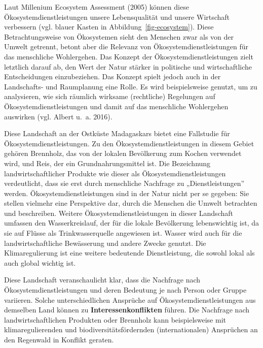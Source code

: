 \documentclass[
  nswissgerman,
  a4paper,
  openany]{book}
\begin{document}
Laut Millenium Ecosystem Assessment (2005) können diese
Ökosystemdienstleistungen unsere Lebensqualität und unsere Wirtschaft
verbessern (vgl. blauer Kasten in Abbildung~\ref{fig-ecosystem}). Diese
Betrachtungsweise von Ökosystemen sieht den Menschen zwar als von der
Umwelt getrennt, betont aber die Relevanz von Ökosystemdienstleistungen
für das menschliche Wohlergehen. Das Konzept der
Ökosystemdienstleistungen zielt letztlich darauf ab, den Wert der Natur
stärker in politische und wirtschaftliche Entscheidungen einzubeziehen.
Das Konzept spielt jedoch auch in der Landschafts- und Raumplanung eine
Rolle. Es wird beispielsweise genutzt, um zu analysieren, wie sich
räumlich wirksame (rechtliche) Regelungen auf Ökosystemdienstleistungen
und damit auf das menschliche Wohlergehen auswirken (vgl. {Albert u.~a.}
2016).

\begin{tcolorbox}[enhanced jigsaw, arc=.35mm, bottomrule=.15mm, bottomtitle=1mm, breakable, colback=white, colbacktitle=quarto-callout-tip-color!10!white, colframe=quarto-callout-tip-color-frame, coltitle=black, left=2mm, leftrule=.75mm, opacityback=0, opacitybacktitle=0.6, rightrule=.15mm, title={Fallstudie: Ökosystemdienstleistungen in Madagaskar}, titlerule=0mm, toprule=.15mm, toptitle=1mm]

Diese Landschaft an der Ostküste Madagaskars bietet eine Fallstudie für
Ökosystemdienstleistungen. Zu den Ökosystemdienstleistungen in diesem
Gebiet gehören Brennholz, das von der lokalen Bevölkerung zum Kochen
verwendet wird, und Reis, der ein Grundnahrungsmittel ist. Die
Bezeichnung landwirtschaftlicher Produkte wie dieser als
Ökosystemdienstleistungen verdeutlicht, dass sie erst durch menschliche
Nachfrage zu „Dienstleistungen'' werden. Ökosystemdienstleistungen sind
in der Natur nicht per se gegeben: Sie stellen vielmehr eine Perspektive
dar, durch die Menschen die Umwelt betrachten und beschreiben. Weitere
Ökosystemdienstleistungen in dieser Landschaft umfassen den
Wasserkreislauf, der für die lokale Bevölkerung lebenswichtig ist, da
sie auf Flüsse als Trinkwasserquelle angewiesen ist. Wasser wird auch
für die landwirtschaftliche Bewässerung und andere Zwecke genutzt. Die
Klimaregulierung ist eine weitere bedeutende Dienstleistung, die sowohl
lokal als auch global wichtig ist.

Diese Landschaft veranschaulicht klar, dass die Nachfrage nach
Ökosystemdienstleistungen und deren Bedeutung je nach Person oder Gruppe
variieren. Solche unterschiedlichen Ansprüche auf
Ökosystemdienstleistungen aus demselben Land können zu
\textbf{Interessenkonflikten} führen. Die Nachfrage nach
landwirtschaftlichen Produkten oder Brennholz kann beispielsweise mit
klimaregulierenden und biodiversitätsfördernden (internationalen)
Ansprüchen an den Regenwald in Konflikt geraten.

\end{tcolorbox}
\end{document}
